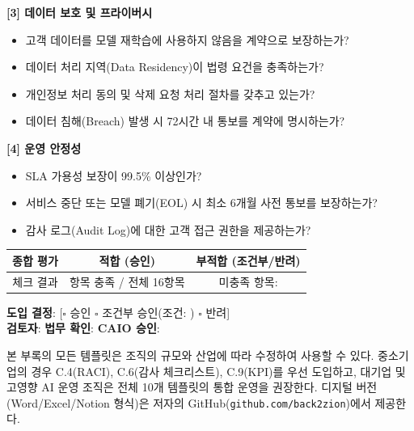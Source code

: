 \begin{tcolorbox}[colback=purple!5, colframe=purple!60, title={[Template C.10] AI 공급망 리스크 평가 (Vendor Due Diligence)}]
\textbf{[3] 데이터 보호 및 프라이버시}
\begin{itemize}
    \item[$\square$] 고객 데이터를 모델 재학습에 사용하지 않음을 계약으로 보장하는가?
    \item[$\square$] 데이터 처리 지역(Data Residency)이 법령 요건을 충족하는가?
    \item[$\square$] 개인정보 처리 동의 및 삭제 요청 처리 절차를 갖추고 있는가?
    \item[$\square$] 데이터 침해(Breach) 발생 시 72시간 내 통보를 계약에 명시하는가?
\end{itemize}

\textbf{[4] 운영 안정성}
\begin{itemize}
    \item[$\square$] SLA 가용성 보장이 99.5\% 이상인가?
    \item[$\square$] 서비스 중단 또는 모델 폐기(EOL) 시 최소 6개월 사전 통보를 보장하는가?
    \item[$\square$] 감사 로그(Audit Log)에 대한 고객 접근 권한을 제공하는가?
\end{itemize}

\begin{center}
\begin{tabular}{|c|c|c|}
\hline
\textbf{종합 평가} & \textbf{적합 (승인)} & \textbf{부적합 (조건부/반려)} \\ \hline
체크 결과 & \hspace{1cm}항목 충족 / 전체 16항목 & 미충족 항목: \hspace{1cm} \\ \hline
\end{tabular}
\end{center}

\textbf{도입 결정}: [$\square$ 승인 $\square$ 조건부 승인(조건: \underline{\hspace{3cm}}) $\square$ 반려] \\
\textbf{검토자}: \underline{\hspace{3cm}} \quad \textbf{법무 확인}: \underline{\hspace{2cm}} \quad \textbf{CAIO 승인}: \underline{\hspace{2cm}}
\end{tcolorbox}

\vspace{1em}
\begin{tcolorbox}[colback=blue!5, colframe=blue!60, title=부록 C 활용 안내]
본 부록의 모든 템플릿은 조직의 규모와 산업에 따라 수정하여 사용할 수 있다. 중소기업의 경우 C.4(RACI), C.6(감사 체크리스트), C.9(KPI)를 우선 도입하고, 대기업 및 고영향 AI 운영 조직은 전체 10개 템플릿의 통합 운영을 권장한다. 디지털 버전(Word/Excel/Notion 형식)은 저자의 GitHub(\texttt{github.com/back2zion})에서 제공한다.
\end{tcolorbox}
